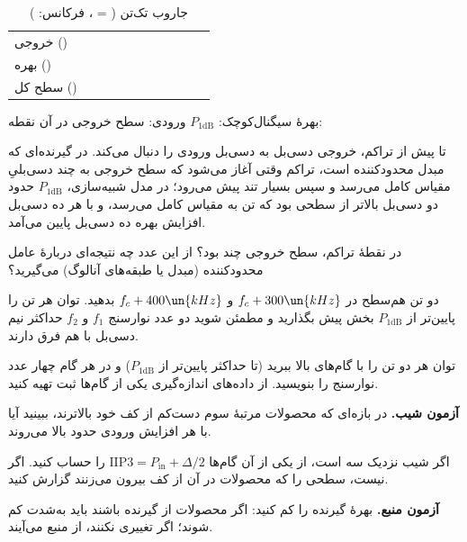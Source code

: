 \documentclass[a4paper,11pt]{article}
\begin{document}
\begin{table}[H]
	\centering\small
	\caption{جاروب تک‌تن ( = \blank[1cm] ، فرکانس: \blank[1.4cm] )}
	\label{tab:p1db}
	\begin{tabularx}{\linewidth}{|X|Y|Y|Y|Y|Y|Y|Y|Y|Y|Y|}
		\hline
		\hdrrow {} & \rowstrut & & & & & & & & & \\ \hline
		خروجی (\dBFS) & \rowstrut & & & & & & & & & \\ \hline
		بهره () & \rowstrut & & & & & & & & & \\ \hline
		سطح کل (\dBFS) & \rowstrut & & & & & & & & & \\ \hline
	\end{tabularx}
\end{table}
\noindent
{\small بهرهٔ سیگنال‌کوچک: \blank[1.6cm]  \hfill $P_{\mathrm{1dB}}$ ورودی: \blank[1.6cm]  \hfill سطح خروجی در آن نقطه: \blank[1.6cm] \dBFS}

\begin{expectbox}
تا پیش از تراکم، خروجی دسی‌بل به دسی‌بل ورودی را دنبال می‌کند. در گیرنده‌ای که مبدل محدودکننده است، تراکم وقتی آغاز می‌شود که سطح خروجی به چند دسی‌بلیِ مقیاس کامل می‌رسد و سپس بسیار تند پیش می‌رود؛ در مدل شبیه‌سازی،
$P_{\mathrm{1dB}}$
حدود دو دسی‌بل بالاتر از سطحی بود که تن به مقیاس کامل می‌رسد، و با هر ده دسی‌بل افزایش بهره ده دسی‌بل پایین می‌آمد.
\end{expectbox}

\begin{question}
در نقطهٔ تراکم، سطح خروجی چند
\dBFS{}
بود؟ از این عدد چه نتیجه‌ای دربارهٔ عامل محدودکننده (مبدل یا طبقه‌های آنالوگ) می‌گیرید؟
\end{question}

\label{part:ip3}
\begin{steps}
\item دو تن هم‌سطح در
$f_c + 300\un{kHz}$
و
$f_c + 400\un{kHz}$
بدهید. توان هر تن را
پایین‌تر از
$P_{\mathrm{1dB}}$
بخش پیش بگذارید و مطمئن شوید دو عدد نوارسنج
$f_1$
و
$f_2$
حداکثر نیم دسی‌بل با هم فرق دارند.
\item توان هر دو تن را با گام‌های
بالا ببرید (تا حداکثر
پایین‌تر از
$P_{\mathrm{1dB}}$)
و در هر گام چهار عدد نوارسنج را بنویسید. از داده‌های اندازه‌گیری یکی از گام‌ها ثبت تهیه کنید.
\item \textbf{آزمون شیب.} در بازه‌ای که محصولات مرتبهٔ سوم دست‌کم
از کف خود بالاترند، ببینید آیا با هر
افزایش ورودی حدود
بالا می‌روند.
\item اگر شیب نزدیک سه است، از یکی از آن گام‌ها
$\mathrm{IIP3} = P_{\mathrm{in}} + \Delta/2$
را حساب کنید. اگر نیست، سطحی را که محصولات در آن از کف بیرون می‌زنند گزارش کنید.
\item \textbf{آزمون منبع.} بهرهٔ گیرنده را
کم کنید: اگر محصولات از گیرنده باشند باید به‌شدت کم شوند؛ اگر تغییری نکنند، از منبع می‌آیند.
\end{steps}
\end{document}
